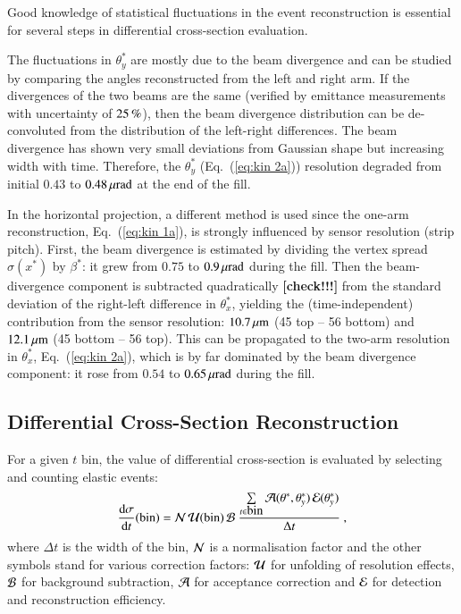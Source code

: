 Good knowledge of statistical fluctuations in the event reconstruction is essential for several steps in differential cross-section evaluation.

The fluctuations in $\theta_y^*$ are mostly due to the beam divergence and can be studied by comparing the angles reconstructed from the left and right arm. If the divergences of the two beams are the same (verified by emittance measurements with uncertainty of $25\,{\rm \%}$), then the beam divergence distribution can be de-convoluted from the distribution of the left-right differences. The beam divergence has shown very small deviations from Gaussian shape but increasing width with time. Therefore, the $\theta_y^*$ (Eq.~(\ref{eq:kin 2a})) resolution degraded from initial $0.43$ to $0.48\,{\rm \mu rad}$ at the end of the fill.

In the horizontal projection, a different method is used since the one-arm reconstruction, Eq.~(\ref{eq:kin 1a}), is strongly influenced by sensor resolution (strip pitch). First, the beam divergence is estimated by dividing the vertex spread $\sigma(x^*)$ by $\beta^*$: it grew from $0.75$ to $0.9\,{\rm \mu rad}$ during the fill. Then the beam-divergence component is subtracted quadratically \textbf{[check!!!]} 
from the standard deviation of the right-left difference in $\theta_x^*$, yielding the (time-independent) contribution from the sensor resolution: $10.7\,{\rm \mu m}$ (45 top -- 56 bottom) and $12.1\,{\rm \mu m}$ (45 bottom -- 56 top). This can be propagated to the two-arm resolution in $\theta_x^*$, Eq.~({\ref{eq:kin 2a}}), which is by far dominated by the beam divergence component: it rose from $0.54$ to $0.65\,{\rm \mu rad}$ during the fill. 


\subsection{Differential Cross-Section Reconstruction}
\label{sec:diff cs}

For a given $t$ bin, the value of differential cross-section is evaluated by selecting and counting elastic events:
\begin{equation}
{\d\sigma\over \d t}(\hbox{bin}) =
	{\cal N}\, {\cal U}({\rm bin})\, {\cal B}\ 
	{\sum\limits_{t \in \hbox{bin}} {\cal A}(\theta^*, \theta_y^*)\, {\cal E}(\theta_y^*)\over \Delta t}\ ,
\end{equation}
where $\Delta t$ is the width of the bin, ${\cal N}$ is a normalisation factor and the other symbols stand for various correction factors:
 ${\cal U}$ for unfolding of resolution effects, ${\cal B}$ for background subtraction, ${\cal A}$ for acceptance correction and ${\cal E}$ for detection and reconstruction efficiency.

